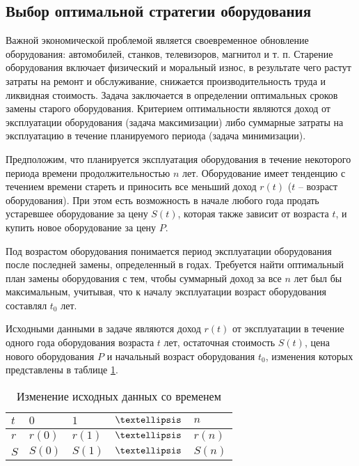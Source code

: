 \subsection{Выбор оптимальной стратегии оборудования}

Важной экономической проблемой является своевременное обновление оборудования: автомобилей, станков, телевизоров, магнитол и т. п. Старение оборудования включает физический и моральный износ, в результате чего растут затраты на ремонт и обслуживание, снижается производительность труда и ликвидная стоимость. Задача заключается в определении оптимальных сроков замены старого оборудования. Критерием оптимальности являются доход от эксплуатации оборудования (задача максимизации) либо суммарные затраты на эксплуатацию в течение планируемого периода (задача минимизации).

Предположим, что планируется эксплуатация оборудования в течение некоторого периода времени продолжительностью $n$ лет. Оборудование имеет тенденцию с течением времени стареть и приносить все меньший доход $r(t)$ ($t$ – возраст оборудования). При этом есть возможность в начале любого года продать устаревшее оборудование за цену $S(t)$, которая также зависит от возраста $t$, и купить новое оборудование за цену $P$.

Под возрастом оборудования понимается период эксплуатации оборудования после последней замены, определенный в годах. Требуется найти оптимальный план замены оборудования с тем, чтобы суммарный доход за все $n$ лет был бы максимальным, учитывая, что к началу эксплуатации возраст оборудования составлял $t_0$ лет.

Исходными данными в задаче являются доход $r(t)$ от эксплуатации в течение одного года оборудования возраста $t$ лет, остаточная стоимость $S(t)$, цена нового оборудования $P$ и начальный возраст оборудования $t_0$, изменения которых представлены в таблице \ref{table:hardware:arguments:change}.


\begin{table}[!ht]
	\caption{Изменение исходных данных со временем}
	\label{table:hardware:arguments:change}
  \centering
  \begin{tabularx}{\linewidth}{ |X|X|X|X|X| }
	\hline
	$t$ & $0$ & $1$ & $ \textellipsis $ & $n$\\
	\hline
	$r$ & $r(0)$ & $r(1)$ & $ \textellipsis $ & $r(n)$\\
	\hline
	$S$ & $S(0)$ & $S(1)$ & $ \textellipsis $ & $S(n)$\\
	\hline
  \end{tabularx}
\end{table}

